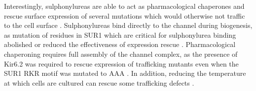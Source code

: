 Interestingly, sulphonylureas are able to act as pharmacological chaperones and rescue surface expression of several mutations which would otherwise not traffic to the cell surface \cite{yan_sulfonylureas_2004, yan_sulfonylureas_2006, yan_congenital_2007, yan_congenital_2007-1, martin_pharmacological_2016}.
Sulphonylureas bind directly to the channel during biogenesis, as mutation of residues in SUR1 which are critical for sulphonylurea binding abolished or reduced the effectiveness of expression rescue \cite{yan_sulfonylureas_2006}.
Pharmacological chaperoning requires full assembly of the channel complex, as the presence of Kir6.2 was required to rescue expression of trafficking mutants even when the SUR1 RKR motif was mutated to AAA \cite{yan_sulfonylureas_2006}.
In addition, reducing the temperature at which cells are cultured can rescue some trafficking defects \cite{yang_low_2005}.

